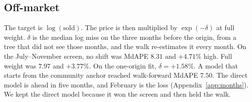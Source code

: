 \documentclass[11pt]{article}
\begin{document}
\subsection{Off-market}

The target is \(\log(\mathrm{sold})\). The price is then multiplied by \(\exp(-\delta)\) at full weight. \(\delta\) is the median log miss on the three months before the origin, from a tree that did not see those months, and the walk re-estimates it every month. On the July--November screen, no shift was MdAPE \(8.31\) and \(+4.71\%\) high. Full weight was \(7.97\) and \(+3.77\%\). On the one-origin fit, \(\delta=+1.58\%\). A model that starts from the community anchor reached walk-forward MdAPE \(7.50\). The direct model is ahead in five months, and February is the loss (Appendix~\ref{app:months}). We kept the direct model because it won the screen and then held the walk.
\end{document}
